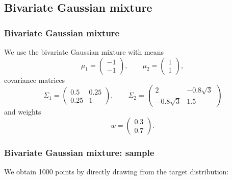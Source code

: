 \documentclass{beamer}
\begin{document}
\subsection{Bivariate Gaussian mixture}

\begin{frame}
\frametitle{Bivariate Gaussian mixture}

We use the bivariate Gaussian mixture with means 
$$
\mu_1 = \begin{pmatrix} -1 \\ -1 \end{pmatrix}, \qquad
\mu_2 = \begin{pmatrix} 1 \\ 1 \end{pmatrix},
$$
covariance matrices
$$
\Sigma_1 = \begin{pmatrix}
0.5 & 0.25\\
0.25 & 1
\end{pmatrix}, \qquad
\Sigma_2 = \begin{pmatrix}
2 & -0.8 \sqrt{3}\\
-0.8 \sqrt{3} & 1.5
\end{pmatrix}
$$
and weights
$$w = \begin{pmatrix} 0.3 \\ 0.7 \end{pmatrix}.$$

\end{frame}

\begin{frame}
\frametitle{Bivariate Gaussian mixture: sample}

We obtain 1000 points by directly drawing from the target distribution:

\begin{figure}[H]
\centering
{}
\end{figure}

\end{frame}
\end{document}
